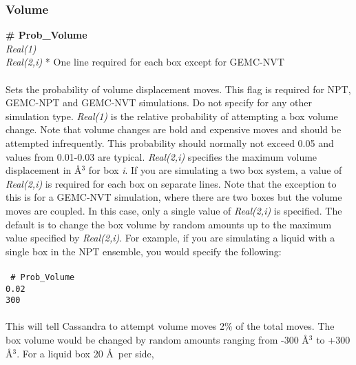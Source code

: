\subsubsection{Volume}
{\bf \# Prob\_Volume} \\
{\it Real(1)} \\ 
{\it Real(2,i)} * One line required for each box except for
GEMC-NVT\\ \\
%
Sets the probability of volume displacement moves. This flag is
required for NPT, GEMC-NPT and GEMC-NVT simulations. Do not specify
for any other simulation type. {\it Real(1)} is the relative probability of
attempting a box volume change. Note that volume changes are bold and
expensive moves and should be attempted infrequently. This probability
should normally not exceed 0.05 and values from 0.01-0.03 are
typical. {\it Real(2,i)} specifies the maximum volume displacement in
\AA$^3$ for box {\em i}. If you are simulating a two box system, a
value of {\it Real(2,i)} is required for each box on separate
lines. Note that the exception to this is for a GEMC-NVT simulation,
where there are two boxes but the volume moves are coupled. In this
case, only a single value of {\it Real(2,i)} is specified. The default
is to change the box volume by random amounts up to the maximum value
specified by {\it Real(2,i)}. 
%
For example, if you are simulating a liquid with a single box in the NPT ensemble,
you would specify the following: \\ \\ 
%                                                                                                                                            
\texttt{
\# Prob\_Volume \\
0.02 \\
300} \\ \\
%                                                                                                                                           
This will tell Cassandra to attempt volume moves 2\% of the
total moves. The box volume would be changed by random amounts ranging from
-300 \AA$^3$ to +300 \AA$^3$. For a liquid box 20 \AA\ per side,
